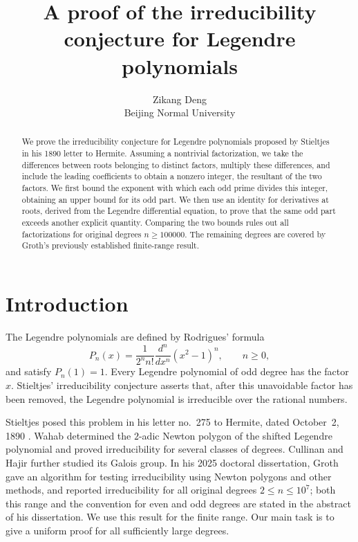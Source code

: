 \documentclass[11pt,a4paper]{article}
\date{}
\title{\LARGE\bfseries A proof of the irreducibility conjecture for Legendre polynomials}
\author{Zikang Deng\\[4pt]\normalsize Beijing Normal University}
\numberwithin{equation}{section}
\theoremstyle{definition}
\begin{document}
\maketitle
\begin{abstract}
We prove the irreducibility conjecture for Legendre polynomials proposed by Stieltjes in his 1890 letter to Hermite. Assuming a nontrivial factorization, we take the differences between roots belonging to distinct factors, multiply these differences, and include the leading coefficients to obtain a nonzero integer, the resultant of the two factors. We first bound the exponent with which each odd prime divides this integer, obtaining an upper bound for its odd part. We then use an identity for derivatives at roots, derived from the Legendre differential equation, to prove that the same odd part exceeds another explicit quantity. Comparing the two bounds rules out all factorizations for original degrees $n \ge 100000$. The remaining degrees are covered by Groth's previously established finite-range result.
\end{abstract}

\section{Introduction}\label{sec:intro}

The Legendre polynomials are defined by Rodrigues' formula
\begin{equation}\label{eq:rodrigues}
P_n(x)=\frac{1}{2^n n!}\frac{d^n}{dx^n}(x^2-1)^n,\qquad n\ge0,
\end{equation}
and satisfy \(P_n(1)=1\). Every Legendre polynomial of odd degree has the factor \(x\). Stieltjes' irreducibility conjecture asserts that, after this unavoidable factor has been removed, the Legendre polynomial is irreducible over the rational numbers.

Stieltjes posed this problem in his letter no.~275 to Hermite, dated October~2, 1890 \cite{stieltjes,cullinan}. Wahab \cite{wahab} determined the $2$-adic Newton polygon of the shifted Legendre polynomial and proved irreducibility for several classes of degrees. Cullinan and Hajir \cite{cullinan} further studied its Galois group. In his 2025 doctoral dissertation, Groth \cite{groth} gave an algorithm for testing irreducibility using Newton polygons and other methods, and reported irreducibility for all original degrees \(2\le n\le10^7\); both this range and the convention for even and odd degrees are stated in the abstract of his dissertation. We use this result for the finite range. Our main task is to give a uniform proof for all sufficiently large degrees.
\end{document}
